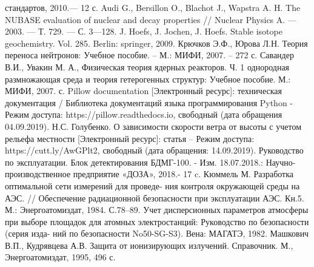 \begin{thebibliography}{99}
		стандартов, 2010.— 12 с.
	 Audi G., Bersillon O., Blachot J., Wapstra A. H. The NUBASE evaluation of nuclear and decay properties 
		// Nuclear Physics A. — 2003. — Т. 729. — С. 3—128. 
	 J. Hoefs, J. Jochen, J. Hoefs. Stable isotope geochemistry. Vol. 285. Berlin: springer, 2009.
	 Крючков Э.Ф., Юрова Л.Н. Теория переноса нейтронов: Учебное пособие. – М.: МИФИ, 2007. – 272 с. 
	 Савандер В.И., Увакин М. А., Физическая теория ядерных реакторов. Ч. 1 однородная размножающая среда 
		и теория гетерогенных структур: Учебное пособие. М.: МИФИ, 2007. с.
	 Pillow documentation [Электронный ресурс]: техническая документация / Библиотека документаций языка программирования 
		Python - Режим доступа: https://pillow.readthedocs.io, свободный (дата обращения 04.09.2019).
	 Н.С. Голубенко. О зависимости скорости ветра от высоты с учетом рельефа местности [Электронный ресурс]: статья – 
		Режим доступа: https://cutt.ly/AwGPlt2, свободный (дата обращения: 14.09.2019).
	 Руководство по эксплуатации. Блок детектирования БДМГ-100. - Изм. 18.07.2018.: Научно-производственное предприятие 
		«ДОЗА», 2018.- 17 c.
	 Кюммель М. Разработка оптимальной сети измерений для проведе- ния контроля окружающей среды на АЭС. // 
		Обеспечение радиационной безопасности при эксплуатации АЭС. Кн.5. М.: Энергоатомиздат, 1984. С.78–89.
	 Учет дисперсионных параметров атмосферы при выборе площадок для атомных электростанций: Руководство по безопасности 
		(серия изда- ний по безопасности No50-SG-S3). Вена: МАГАТЭ, 1982.
	 Машкович В.П., Кудрявцева А.В. Защита от ионизирующих излучений. Справочник. М., Энергоатомиздат, 1995, 496 с.

\end{thebibliography}